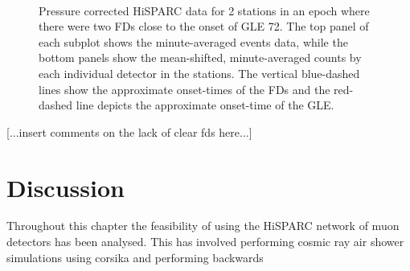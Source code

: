 \begin{figure}[ht]
	\centering
	 \\
	
	
	\caption{Pressure corrected HiSPARC data for 2 stations in an epoch where there were two FDs close to the onset of GLE 72. The top panel of each subplot shows the minute-averaged events data, while the bottom panels show the mean-shifted, minute-averaged counts by each individual detector in the stations. The vertical blue-dashed lines show the approximate onset-times of the FDs and the red-dashed line depicts the approximate onset-time of the GLE.}
	\label{fig:FD_GLE72_Pcorr}
\end{figure}

[...insert comments on the lack of clear fds here...]



\section{Discussion}\label{sec:HS_discussion}

Throughout this chapter the feasibility of using the HiSPARC network of muon detectors has been analysed. This has involved performing cosmic ray air shower simulations using \gls{corsika} and performing backwards


